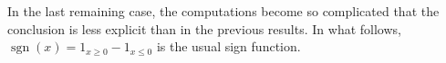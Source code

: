 \documentclass[11pt]{amsart}
\theoremstyle{definition}
\DeclareMathOperator*{\E}{\mathbb{E}}
\newcommand{\R}{{\mathbb R}}
\newcommand{\Z}{{\mathbb Z}}
\newcommand{\e}{\varepsilon}%
\newcommand{\1}{{\mathbf{1}}}
\DeclareMathOperator{\sgn}{sgn}
\newcommand{\floor}[1]{{\left \lfloor #1 \right \rfloor}}
\begin{document}

In the last remaining case, the computations become so complicated that the conclusion is less explicit than in the previous results. In what follows, $\sgn(x) = 1_{x\geq 0}-1_{x\leq 0}$ is the usual sign function.
\end{document}
